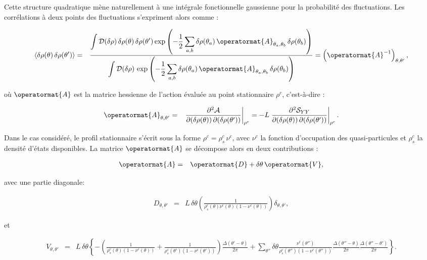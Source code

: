 Cette structure quadratique mène naturellement à une intégrale fonctionnelle gaussienne pour la probabilité des fluctuations. Les corrélations à deux points des fluctuations s’expriment alors comme :

\begin{eqnarray*}
    \langle \delta \rho(\theta) \, \delta \rho(\theta') \rangle 
    & = &   
    \frac{  \displaystyle \int \mathcal{D}(\delta \rho) \, \delta \rho(\theta) \, \delta \rho(\theta') 
    \exp\left( -\frac{1}{2} \sum_{a,b} \delta \rho(\theta_a) \, 
    \operatormat{A}_{\theta_a, \theta_b} \, \delta \rho(\theta_b) \right) }
    { \displaystyle \int \mathcal{D}(\delta \rho) \, 
    \exp\left( -\frac{1}{2} \sum_{a,b} \delta \rho(\theta_a) \, 
    \operatormat{A}_{\theta_a, \theta_b} \, \delta \rho(\theta_b) \right) } 
    = \left( \operatormat{A}^{-1} \right)_{\theta, \theta'},
\end{eqnarray*}

où \( \operatormat{A} \) est la matrice hessienne de l’action évaluée au point stationnaire \( \rho^c \), c’est-à-dire :

\begin{eqnarray*}
    \operatormat{A}_{\theta, \theta'} & = & \left. 
    \frac{\partial^2 \mathcal{A}}{\partial(\delta \rho(\theta)) \, \partial (\delta \rho(\theta'))}\right|_{\rho^c} = - L  \left. 
    \frac{\partial^2 \mathcal{S}_{YY}}{\partial(\delta \rho(\theta)) \, \partial (\delta \rho(\theta'))}\right|_{\rho^c}
    .
\end{eqnarray*}

Dans le cas considéré, le profil stationnaire s’écrit sous la forme \( \rho^c = \rho^c_s \, \nu^c \), avec \( \nu^c \) la fonction d’occupation des quasi-particules et \( \rho^c_s \) la densité d’états disponibles. La matrice \( \operatormat{A} \) se décompose alors en deux contributions :

\begin{eqnarray*}
    \operatormat{A} & = & \operatormat{D} + \delta\theta \, \operatormat{V},
\end{eqnarray*}

avec une partie diagonale:

\begin{eqnarray*}
    D_{\theta, \theta'} & = &
    L \, \delta\theta \left( \frac{1}{\rho^c_s(\theta) \nu^c(\theta)(1 - \nu^c(\theta)) } \right) 
    \delta_{\theta,\theta'}, 
\end{eqnarray*}

et 

\begin{eqnarray*}
    V_{\theta, \theta'}  &=& L \, \delta\theta \left\{ 
    - \left( 
     \frac{1}{\rho^c_s(\theta)(1 - \nu^c(\theta))} 
    +  \frac{1}{\rho^c_s(\theta')(1 - \nu^c(\theta'))}
    \right) \frac{\Delta(\theta' - \theta)}{2\pi}  
    +  \sum_{\theta''} \delta\theta 
    \frac{\nu^c(\theta'') }{\rho^c_s(\theta'')  (1 - \nu^c(\theta'') )} 
    \frac{\Delta(\theta'' - \theta)}{2\pi} 
    \frac{\Delta(\theta'' - \theta')}{2\pi} \right\}.
\end{eqnarray*}

